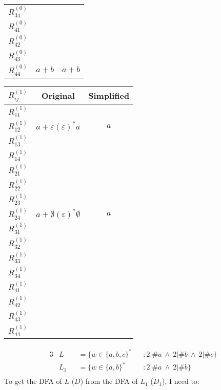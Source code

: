 \documentclass[docid=2017/18]{tcom_exam}
\begin{document}
{\begin{minipage}[c]{0.49\textwidth}
\begin{center}
\begin{tabular}{r || c | c}
			$R_{34}^{(0)}$ &   &   \\
			$R_{41}^{(0)}$ &   &   \\
			$R_{42}^{(0)}$ &   &   \\
			$R_{43}^{(0)}$ &   &   \\
			$R_{44}^{(0)}$ & $a+b$ &  $a+b$ \\  
		\end{tabular}
	\end{center}
\end{minipage}
\begin{minipage}[c]{0.49\textwidth}
	\begin{center}
		\begin{tabular}{r || c | c}
			$R_{ij}^{(1)}$ & Original & Simplified \\ \hline
			$R_{11}^{(1)}$ &   &   \\
			$R_{12}^{(1)}$ & $a+\varepsilon(\varepsilon)^*a$ & $a$ \\
			$R_{13}^{(1)}$ &   &   \\
			$R_{14}^{(1)}$ &   &   \\ 
			$R_{21}^{(1)}$ &   &   \\
			$R_{22}^{(1)}$ &   &   \\
			$R_{23}^{(1)}$ &   &   \\
			$R_{24}^{(1)}$ & $a+\emptyset(\varepsilon)^*\emptyset$ & $a$ \\ 
			$R_{31}^{(1)}$ &   &   \\
			$R_{32}^{(1)}$ &   &   \\
			$R_{33}^{(1)}$ &   &   \\
			$R_{34}^{(1)}$ &   &   \\
			$R_{41}^{(1)}$ &   &   \\
			$R_{42}^{(1)}$ &   &   \\
			$R_{43}^{(1)}$ &   &   \\
			$R_{44}^{(1)}$ &   &   \\  
		\end{tabular}
	\end{center}
\end{minipage}
\pagebreak
{}
\begin{alignat*}{3}
	&L   &&= \{w \in \{a,b,c\}^* && \colon 2|\#a~\wedge~2|\#b~\wedge~2|\#c\}\\
	&L_1 &&= \{w \in \{a,b\}^* && \colon 2|\#a~\wedge~2|\#b\}\\
\end{alignat*}
To get the DFA of $L$ ($D$) from the DFA of $L_1$ ($D_1$), I need to:
\begin{enumerate}

\end{enumerate}}
\end{document}
